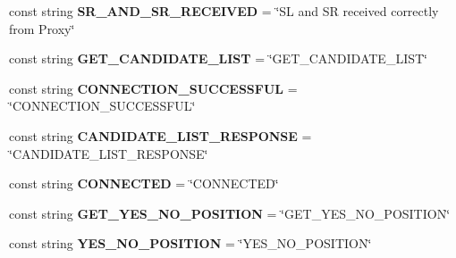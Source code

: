 \begin{DoxyCompactItemize}
\item 
\hypertarget{class_voter_1_1_constants_a64b8dadf17f3914c61776d0d16b033e0}{}const string {\bfseries S\+R\+\_\+\+A\+N\+D\+\_\+\+S\+R\+\_\+\+R\+E\+C\+E\+I\+V\+E\+D} = \char`\"{}S\+L and S\+R received correctly from Proxy\char`\"{}\label{class_voter_1_1_constants_a64b8dadf17f3914c61776d0d16b033e0}

\item 
\hypertarget{class_voter_1_1_constants_a1aea487a06caa625bb74fe68ee49a0f5}{}const string {\bfseries G\+E\+T\+\_\+\+C\+A\+N\+D\+I\+D\+A\+T\+E\+\_\+\+L\+I\+S\+T} = \char`\"{}G\+E\+T\+\_\+\+C\+A\+N\+D\+I\+D\+A\+T\+E\+\_\+\+L\+I\+S\+T\char`\"{}\label{class_voter_1_1_constants_a1aea487a06caa625bb74fe68ee49a0f5}

\item 
\hypertarget{class_voter_1_1_constants_a67c1437e88e6e58782e2355f7e8642a4}{}const string {\bfseries C\+O\+N\+N\+E\+C\+T\+I\+O\+N\+\_\+\+S\+U\+C\+C\+E\+S\+S\+F\+U\+L} = \char`\"{}C\+O\+N\+N\+E\+C\+T\+I\+O\+N\+\_\+\+S\+U\+C\+C\+E\+S\+S\+F\+U\+L\char`\"{}\label{class_voter_1_1_constants_a67c1437e88e6e58782e2355f7e8642a4}

\item 
\hypertarget{class_voter_1_1_constants_ad5e35ebd0d52670f3059a98d8d99cb50}{}const string {\bfseries C\+A\+N\+D\+I\+D\+A\+T\+E\+\_\+\+L\+I\+S\+T\+\_\+\+R\+E\+S\+P\+O\+N\+S\+E} = \char`\"{}C\+A\+N\+D\+I\+D\+A\+T\+E\+\_\+\+L\+I\+S\+T\+\_\+\+R\+E\+S\+P\+O\+N\+S\+E\char`\"{}\label{class_voter_1_1_constants_ad5e35ebd0d52670f3059a98d8d99cb50}

\item 
\hypertarget{class_voter_1_1_constants_ab1cc95a4c964427aecceb66d8e8a756d}{}const string {\bfseries C\+O\+N\+N\+E\+C\+T\+E\+D} = \char`\"{}C\+O\+N\+N\+E\+C\+T\+E\+D\char`\"{}\label{class_voter_1_1_constants_ab1cc95a4c964427aecceb66d8e8a756d}

\item 
\hypertarget{class_voter_1_1_constants_af348e8ebaa630d23a57bc67a00ea532e}{}const string {\bfseries G\+E\+T\+\_\+\+Y\+E\+S\+\_\+\+N\+O\+\_\+\+P\+O\+S\+I\+T\+I\+O\+N} = \char`\"{}G\+E\+T\+\_\+\+Y\+E\+S\+\_\+\+N\+O\+\_\+\+P\+O\+S\+I\+T\+I\+O\+N\char`\"{}\label{class_voter_1_1_constants_af348e8ebaa630d23a57bc67a00ea532e}

\item 
\hypertarget{class_voter_1_1_constants_a4fbbd66809a090f2795cbb5595cc91a4}{}const string {\bfseries Y\+E\+S\+\_\+\+N\+O\+\_\+\+P\+O\+S\+I\+T\+I\+O\+N} = \char`\"{}Y\+E\+S\+\_\+\+N\+O\+\_\+\+P\+O\+S\+I\+T\+I\+O\+N\char`\"{}\label{class_voter_1_1_constants_a4fbbd66809a090f2795cbb5595cc91a4}


\end{DoxyCompactItemize}
